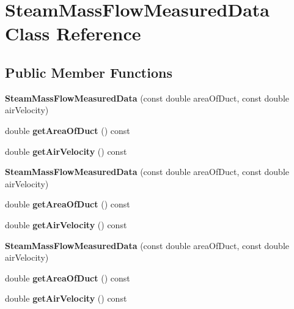\hypertarget{class_steam_mass_flow_measured_data}{}\section{Steam\+Mass\+Flow\+Measured\+Data Class Reference}
\label{class_steam_mass_flow_measured_data}
\subsection*{Public Member Functions}
\begin{DoxyCompactItemize}
\item 
\mbox{\label{class_steam_mass_flow_measured_data_ab67cf6bf08e77c18d900da9320e2bf72}} 
{\bfseries Steam\+Mass\+Flow\+Measured\+Data} (const double area\+Of\+Duct, const double air\+Velocity)
\item 
\mbox{\label{class_steam_mass_flow_measured_data_aeb84129b5105965108f19a1f5d2f40d1}} 
double {\bfseries get\+Area\+Of\+Duct} () const
\item 
\mbox{\label{class_steam_mass_flow_measured_data_a1d4934972d3e194d398f84c0ea9dec1a}} 
double {\bfseries get\+Air\+Velocity} () const
\item 
\mbox{\label{class_steam_mass_flow_measured_data_ab67cf6bf08e77c18d900da9320e2bf72}} 
{\bfseries Steam\+Mass\+Flow\+Measured\+Data} (const double area\+Of\+Duct, const double air\+Velocity)
\item 
\mbox{\label{class_steam_mass_flow_measured_data_aeb84129b5105965108f19a1f5d2f40d1}} 
double {\bfseries get\+Area\+Of\+Duct} () const
\item 
\mbox{\label{class_steam_mass_flow_measured_data_a1d4934972d3e194d398f84c0ea9dec1a}} 
double {\bfseries get\+Air\+Velocity} () const
\item 
\mbox{\label{class_steam_mass_flow_measured_data_ab67cf6bf08e77c18d900da9320e2bf72}} 
{\bfseries Steam\+Mass\+Flow\+Measured\+Data} (const double area\+Of\+Duct, const double air\+Velocity)
\item 
\mbox{\label{class_steam_mass_flow_measured_data_aeb84129b5105965108f19a1f5d2f40d1}} 
double {\bfseries get\+Area\+Of\+Duct} () const
\item 
\mbox{\label{class_steam_mass_flow_measured_data_a1d4934972d3e194d398f84c0ea9dec1a}} 
double {\bfseries get\+Air\+Velocity} () const
\end{DoxyCompactItemize}


